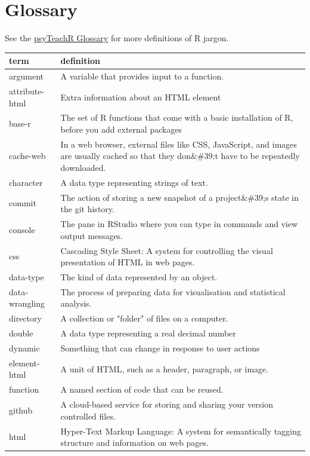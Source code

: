 \documentclass[
  oneside]{book}
\begin{document}
\hypertarget{glossary}{%
\chapter{Glossary}\label{glossary}}

See the \href{https://psyteachr.github.io/glossary/}{psyTeachR Glossary} for more definitions of R jargon.

\begin{tabular}{l|l}
\hline
term & definition\\
\hline
argument & A variable that provides input to a function.\\
\hline
attribute-html & Extra information about an HTML element\\
\hline
base-r & The set of R functions that come with a basic installation of R, before you add external packages\\
\hline
cache-web & In a web browser, external files like CSS, JavaScript, and images are usually cached so that they don\&\#39;t have to be repeatedly downloaded.\\
\hline
character & A data type representing strings of text.\\
\hline
commit & The action of storing a new snapshot of a project\&\#39;s state in the git history.\\
\hline
console & The pane in RStudio where you can type in commands and view output messages.\\
\hline
css & Cascading Style Sheet: A system for controlling the visual presentation of HTML in web pages.\\
\hline
data-type & The kind of data represented by an object.\\
\hline
data-wrangling & The process of preparing data for visualisation and statistical analysis.\\
\hline
directory & A collection or "folder" of files on a computer.\\
\hline
double & A data type representing a real decimal number\\
\hline
dynamic & Something that can change in response to user actions\\
\hline
element-html & A unit of HTML, such as a header, paragraph, or image.\\
\hline
function & A named section of code that can be reused.\\
\hline
github & A cloud-based service for storing and sharing your version controlled files.\\
\hline
html & Hyper-Text Markup Language: A system for semantically tagging structure and information on web pages.\\

\end{tabular}
\end{document}
